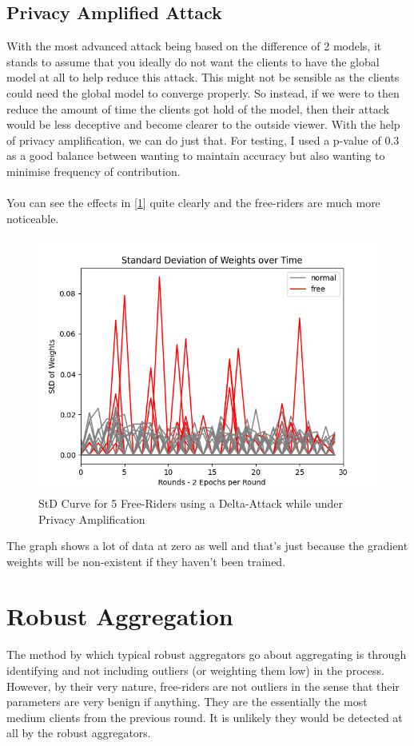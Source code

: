 \subsection{Privacy Amplified Attack}
With the most advanced attack being based on the difference of 2 models, it stands to assume that you ideally do not want the clients to have the global model at all to help reduce this attack.
This might not be sensible as the clients could need the global model to converge properly.
So instead, if we were to then reduce the amount of time the clients got hold of the model, then their attack would be less deceptive and become clearer to the outside viewer.
With the help of privacy amplification, we can do just that.
For testing, I used a p-value of 0.3 as a good balance between wanting to maintain accuracy but also wanting to minimise frequency of contribution.
\\ \\
You can see the effects in [\ref{fig:std_priv}] quite clearly and the free-riders are much more noticeable.
\begin{figure}[htbp]
	\centering
    \includegraphics[scale=0.5]{free_riders/graphs/priv5.png}
	\caption{StD Curve for 5 Free-Riders using a Delta-Attack while under Privacy Amplification}
	\label{fig:std_priv}
\end{figure}

The graph shows a lot of data at zero as well and that's just because the gradient weights will be non-existent if they haven't been trained.


\section{Robust Aggregation}
The method by which typical robust aggregators go about aggregating is through identifying and not including outliers (or weighting them low) in the process.
However, by their very nature, free-riders are not outliers in the sense that their parameters are very benign if anything.
They are the essentially the most medium clients from the previous round. 
It is unlikely they would be detected at all by the robust aggregators.

